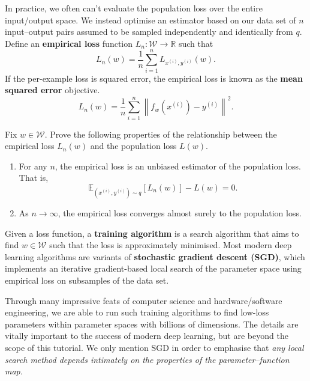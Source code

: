 \documentclass[11pt]{article}
\newcommand{\R}{\mathbb{R}}
\newcommand{\E}{\mathbb{E}}
\newcommand{\W}{\mathcal{W}}
\begin{document}
In practice, we often can't evaluate the population loss over the entire
input/output space. We instead optimise an estimator based on our data set of
$n$ input--output pairs assumed to be sampled independently and identically
from $q$. Define an \textbf{empirical loss} function
    $L_n : \W \to \R$
such that
\begin{equation}
    L_n(w) = \frac1n \sum_{i=1}^n L_{x^{(i)},y^{(i)}}(w).
\end{equation}
If the per-example loss is squared error, the empirical loss is known as the
\textbf{mean squared error} objective.
\begin{equation}
    \label{eq:mse}
    L_n(w)
    =
    \frac1n \sum_{i=1}^n \left\| f_w(x^{(i)}) - y^{(i)} \right\|^2.
\end{equation}

\begin{exercise}
    \label{ex:empirical-population-loss}
    Fix $w \in \W$. Prove the following properties of the relationship between
    the empirical loss $L_n(w)$ and the population loss $L(w)$.
\begin{enumerate}
    \item
        For any $n$, the empirical loss is an unbiased estimator of the
        population loss. That is,
        \begin{equation}
            \E_{(x^{(i)}, y^{(i)}) \sim q}[L_n(w)] - L(w)
            = 0.
        \end{equation}
    \item
        As $n \to \infty$, the empirical loss converges almost surely to the
        population loss.
\end{enumerate}
\end{exercise}

Given a loss function, a \textbf{training algorithm} is a search algorithm that
aims to find $w \in \W$ such that the loss is approximately minimised. Most
modern deep learning algorithms are variants of \textbf{stochastic gradient
descent (SGD)}, which implements an iterative gradient-based local search of
the parameter space using empirical loss on subsamples of the data set.

Through many impressive feats of computer science and hardware/software
engineering, we are able to run such training algorithms to find low-loss
parameters within parameter spaces with billions of dimensions. The details are
vitally important to the success of modern deep learning, but are beyond the
scope of this tutorial. We only mention SGD in order to emphasise that
\emph{any local search method depends intimately on the properties of the
parameter--function map.}
\end{document}
